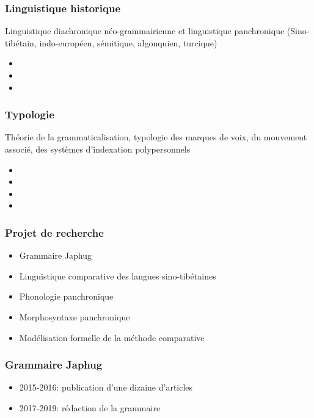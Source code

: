 \documentclass[xcolor=table]{beamer}
\begin{document}
   \begin{frame} 
 \frametitle{Linguistique historique} 
 
 Linguistique diachronique néo-grammairienne et linguistique panchronique (Sino-tibétain, indo-européen, sémitique, algonquien, turcique)
  \small
 \begin{itemize}%
\item {}  
\item {}  
\item {}  
\end{itemize}
   \end{frame} 
   
   \begin{frame} 
 \frametitle{Typologie} 
 
 Théorie de la grammaticalisation, typologie des marques de voix, du mouvement associé, des systèmes d'indexation polypersonnels
 \small
 \begin{itemize}%
\item {}  
\item {}  
\item {}  
\item {}  
\end{itemize}
   \end{frame} 
    
  \begin{frame} 
 \frametitle{Projet de recherche} 
 

\begin{itemize}%
\item Grammaire Japhug
\item Linguistique comparative des langues sino-tibétaines
\item Phonologie panchronique
\item Morphosyntaxe panchronique  
\item Modélisation formelle de la méthode comparative 
\end{itemize}
   
  \end{frame}   

   \begin{frame} 
 \frametitle{Grammaire Japhug} 
 \begin{itemize}%
 \item 2015-2016: publication d'une dizaine d'articles
\item 2017-2019: rédaction de la grammaire
\end{itemize}
   \end{frame} 
   
\end{document}
